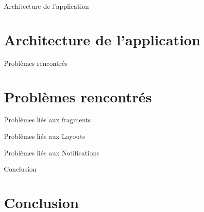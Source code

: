 \documentclass[11pt]{beamer}
\begin{document}
\begin{frame}{Architecture de l'application}
\section{Architecture de l'application}


\end{frame}


\begin{frame}{Problèmes rencontrés}
\section{Problèmes rencontrés}
\begin{mybox}{Problèmes liés aux fragments}\pause
\end{mybox}

\begin{mybox}{Problèmes liés aux Layouts}\pause
\end{mybox}

\begin{mybox}{Problèmes liés aux Notifications}\pause
\end{mybox}

\end{frame}


\begin{frame}{Conclusion}
\section{Conclusion}


\end{frame}
\end{document}

